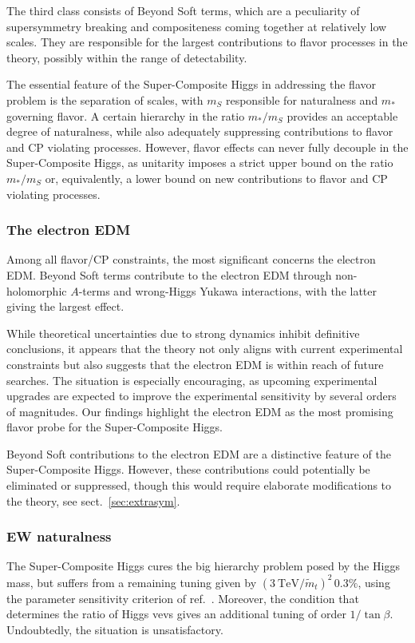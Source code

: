 \documentclass[a4paper,12pt]{article}
\newcommand{\tev}{\textrm{TeV}}
\def\sec#1{sect.~\ref{#1}}
\def\mst{m_*}
\def\mS{m_S}
\begin{document}
{{{{The third class consists of Beyond Soft terms, which are a peculiarity of supersymmetry breaking and compositeness coming together at relatively low scales. 
They are responsible for the largest contributions to flavor processes in the theory, possibly within the range of detectability. 

The essential feature of the Super-Composite Higgs in addressing the flavor problem is the separation of scales, with $\mS$ responsible for naturalness and $\mst$ governing flavor. A certain hierarchy in the ratio $\mst/\mS$ provides an acceptable degree of naturalness, while also adequately suppressing contributions to flavor and CP violating processes. However, flavor effects can never fully decouple in the Super-Composite Higgs, as unitarity imposes a strict upper bound on the ratio $\mst/\mS$ or, equivalently, a lower bound on new contributions to flavor and CP violating processes.

\subsubsection*{The electron EDM}

Among all flavor/CP constraints, the most significant concerns the electron EDM.
Beyond Soft terms contribute to the electron EDM through non-holomorphic $A$-terms and wrong-Higgs Yukawa interactions, with the latter giving the largest effect. 

While theoretical uncertainties due to strong dynamics inhibit definitive conclusions, it appears that the theory not only aligns with current experimental constraints but also suggests that the electron EDM is within reach of future searches. The situation is especially encouraging, as upcoming experimental upgrades are expected to improve the experimental sensitivity by several orders of magnitudes. Our findings highlight the electron EDM as the most promising flavor probe for the Super-Composite Higgs.

Beyond Soft contributions to the electron EDM are a distinctive feature of the Super-Composite Higgs. However, these contributions could potentially be eliminated or suppressed, though this would require  elaborate modifications to the theory, see \sec{sec:extrasym}.

\subsubsection*{EW naturalness}

The Super-Composite Higgs cures the big hierarchy problem posed by the Higgs mass, but suffers from a remaining tuning given by $(3~\tev / {\tilde m}_t)^2 \, 0.3\%$, using the parameter sensitivity criterion of ref.~\cite{Barbieri:1987fn}. Moreover, the condition that determines the ratio of Higgs vevs gives an additional tuning of order
 $1/\tan\beta $. Undoubtedly, the situation is unsatisfactory.

}}}}
\end{document}
